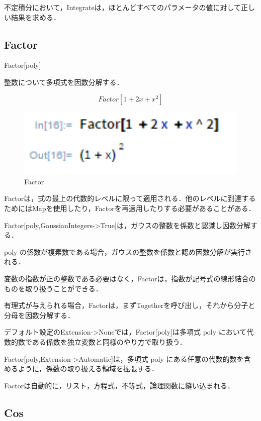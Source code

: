 不定積分において，Integrateは，ほとんどすべてのパラメータの値に対して正しい結果を求める．


\subsection {Factor}

Factor[poly]

整数について多項式を因数分解する．

\[Factor[1 + 2 x + x^2]\]

\begin{figure}[h]
\centering
\includegraphics[width=15cm]{factor.png}
\caption{Factor}\label{図}
\end{figure}

Factorは，式の最上の代数的レベルに限って適用される．他のレベルに到達するためにはMapを使用したり，Factorを再適用したりする必要があることがある．

Factor[poly,GaussianIntegers->True]は，ガウスの整数を係数と認識し因数分解する．

poly の係数が複素数である場合，ガウスの整数を係数と認め因数分解が実行される．

変数の指数が正の整数である必要はなく，Factorは，指数が記号式の線形結合のものを取り扱うことができる．

有理式が与えられる場合，Factorは，まずTogetherを呼び出し，それから分子と分母を因数分解する．

デフォルト設定のExtension->Noneでは，Factor[poly]は多項式 poly において代数的数である係数を独立変数と同様のやり方で取り扱う．

Factor[poly,Extension->Automatic]は，多項式 poly にある任意の代数的数を含めるように，係数の取り扱える領域を拡張する． 

Factorは自動的に，リスト，方程式，不等式，論理関数に縫い込まれる．

\clearpage

\subsection {Cos}

